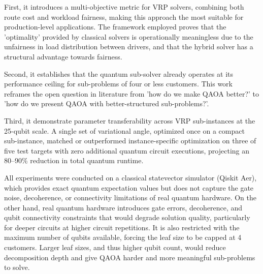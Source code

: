 \documentclass[a4paper]{report}
\begin{document}
{\begin{itemize}
\begin{itemize}
First, it introduces a multi-objective metric for VRP solvers, combining both route cost and workload fairness, making this approach the most suitable for production-level applications. The framework employed proves that the 'optimality' provided by classical solvers is operationally meaningless due to the unfairness in load distribution between drivers, and that the hybrid solver has a structural advantage towards fairness.

Second, it establishes that the quantum sub-solver already operates at its performance ceiling for sub-problems of four or less customers. This work reframes the open question in literature from 'how do we make QAOA better?' to 'how do we present QAOA with better-structured sub-problems?'.

Third, it demonstrate parameter transferability across VRP sub-instances at the 25-qubit scale. A single set of variational angle, optimized once on a compact sub-instance, matched or outperformed instance-specific optimization on three of five test targets with zero additional quantum circuit executions, projecting an 80–90\% reduction in total quantum runtime.


All experiments were conducted on a classical statevector simulator (Qiskit Aer), which provides exact quantum expectation values but does not capture the gate noise, decoherence, or connectivity limitations of real quantum hardware. On the other hand, real quantum hardware introduces gate errors, decoherence, and qubit connectivity constraints that would degrade solution quality, particularly for deeper circuits at higher circuit repetitions.
It is also restricted with the maximum number of qubits available, forcing the leaf size to be capped at 4 customers. Larger leaf sizes, and thus higher qubit count, would reduce decomposition depth and give QAOA harder and more meaningful sub-problems to solve.



\end{itemize}
\end{itemize}}
\end{document}
